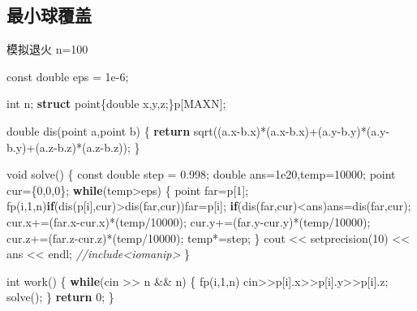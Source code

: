 \documentclass[
]{article}
\newenvironment{Shaded}{}{}
\newcommand{\AttributeTok}[1]{\textcolor[rgb]{0.49,0.56,0.16}{#1}}
\newcommand{\CommentTok}[1]{\textcolor[rgb]{0.38,0.63,0.69}{\textit{#1}}}
\newcommand{\ControlFlowTok}[1]{\textcolor[rgb]{0.00,0.44,0.13}{\textbf{#1}}}
\newcommand{\DataTypeTok}[1]{\textcolor[rgb]{0.56,0.13,0.00}{#1}}
\newcommand{\DecValTok}[1]{\textcolor[rgb]{0.25,0.63,0.44}{#1}}
\newcommand{\FloatTok}[1]{\textcolor[rgb]{0.25,0.63,0.44}{#1}}
\newcommand{\KeywordTok}[1]{\textcolor[rgb]{0.00,0.44,0.13}{\textbf{#1}}}
\newcommand{\NormalTok}[1]{#1}
\begin{document}
\begin{Shaded}
\begin{Highlighting}[]

\end{Highlighting}
\end{Shaded}

\hypertarget{ux6700ux5c0fux7403ux8986ux76d6}{%
\subsection{最小球覆盖}\label{ux6700ux5c0fux7403ux8986ux76d6}}

模拟退火 n=100

\begin{Shaded}
\begin{Highlighting}[]
\AttributeTok{const} \DataTypeTok{double}\NormalTok{ eps = }\FloatTok{1e{-}6}\NormalTok{;}

\DataTypeTok{int}\NormalTok{ n;}
\KeywordTok{struct}\NormalTok{ point\{}\DataTypeTok{double}\NormalTok{ x,y,z;\}p[MAXN];}

\DataTypeTok{double}\NormalTok{ dis(point a,point b)}
\NormalTok{\{}
    \ControlFlowTok{return}\NormalTok{ sqrt((a.x{-}b.x)*(a.x{-}b.x)+(a.y{-}b.y)*(a.y{-}b.y)+(a.z{-}b.z)*(a.z{-}b.z));}
\NormalTok{\}}

\DataTypeTok{void}\NormalTok{ solve()}
\NormalTok{\{}
    \AttributeTok{const} \DataTypeTok{double}\NormalTok{ step = }\FloatTok{0.998}\NormalTok{;}
    \DataTypeTok{double}\NormalTok{ ans=}\FloatTok{1e20}\NormalTok{,temp=}\DecValTok{10000}\NormalTok{;}
\NormalTok{    point cur=\{}\DecValTok{0}\NormalTok{,}\DecValTok{0}\NormalTok{,}\DecValTok{0}\NormalTok{\};}
    \ControlFlowTok{while}\NormalTok{(temp\textgreater{}eps)}
\NormalTok{    \{}
\NormalTok{        point far=p[}\DecValTok{1}\NormalTok{];}
\NormalTok{        fp(i,}\DecValTok{1}\NormalTok{,n)}\ControlFlowTok{if}\NormalTok{(dis(p[i],cur)\textgreater{}dis(far,cur))far=p[i];}
        \ControlFlowTok{if}\NormalTok{(dis(far,cur)\textless{}ans)ans=dis(far,cur);}
\NormalTok{        cur.x+=(far.x{-}cur.x)*(temp/}\DecValTok{10000}\NormalTok{);}
\NormalTok{        cur.y+=(far.y{-}cur.y)*(temp/}\DecValTok{10000}\NormalTok{);}
\NormalTok{        cur.z+=(far.z{-}cur.z)*(temp/}\DecValTok{10000}\NormalTok{);}
\NormalTok{        temp*=step;}
\NormalTok{    \}}
\NormalTok{    cout \textless{}\textless{} setprecision(}\DecValTok{10}\NormalTok{) \textless{}\textless{} ans \textless{}\textless{} endl; }\CommentTok{//include\textless{}iomanip\textgreater{}}
\NormalTok{\}}

\DataTypeTok{int}\NormalTok{ work()}
\NormalTok{\{}
    \ControlFlowTok{while}\NormalTok{(cin \textgreater{}\textgreater{} n \&\& n)}
\NormalTok{    \{}
\NormalTok{        fp(i,}\DecValTok{1}\NormalTok{,n) cin\textgreater{}\textgreater{}p[i].x\textgreater{}\textgreater{}p[i].y\textgreater{}\textgreater{}p[i].z;}
\NormalTok{        solve();}
\NormalTok{    \}}
    \ControlFlowTok{return} \DecValTok{0}\NormalTok{;}
\NormalTok{\}}
\end{Highlighting}
\end{Shaded}
\end{document}
